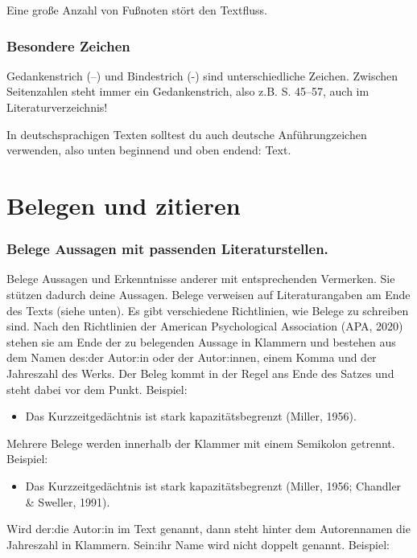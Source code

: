 \documentclass{../cssheet}
\begin{document}
Eine große Anzahl von Fußnoten stört den Textfluss.

\subsubsection*{Besondere Zeichen}

Gedankenstrich (--) und Bindestrich (-) sind unterschiedliche Zeichen. Zwischen Seitenzahlen steht immer ein Gedankenstrich, also z.B. \glqq{}S. 45--57\grqq{}, auch im Literaturverzeichnis!

In deutschsprachigen Texten solltest du auch deutsche Anführungzeichen
verwenden, also unten beginnend und oben endend: \glqq{}Text\grqq{}.

\section{Belegen und zitieren}

\subsubsection*{Belege Aussagen mit passenden Literaturstellen.}

Belege Aussagen und Erkenntnisse anderer mit entsprechenden Vermerken.
Sie stützen dadurch deine Aussagen. Belege verweisen auf
Literaturangaben am Ende des Texts (siehe unten). Es gibt verschiedene
Richtlinien, wie Belege zu schreiben sind. Nach den Richtlinien der
American Psychological Association (APA, 2020) stehen sie am Ende der zu
belegenden Aussage in Klammern und bestehen aus dem Namen des:der Autor:in
oder der Autor:innen, einem Komma und der Jahreszahl des Werks. Der Beleg
kommt in der Regel ans Ende des Satzes und steht dabei vor dem Punkt.
Beispiel:

\begin{itemize}
\item
  Das Kurzzeitgedächtnis ist stark kapazitätsbegrenzt (Miller, 1956).
\end{itemize}

Mehrere Belege werden innerhalb der Klammer mit einem Semikolon
getrennt. Beispiel:

\begin{itemize}
\item
  Das Kurzzeitgedächtnis ist stark kapazitätsbegrenzt (Miller, 1956;
  Chandler \& Sweller, 1991).
\end{itemize}

Wird der:die Autor:in im Text genannt, dann steht hinter dem Autorennamen die
Jahreszahl in Klammern. Sein:ihr Name wird nicht doppelt genannt.
Beispiel:
\end{document}
